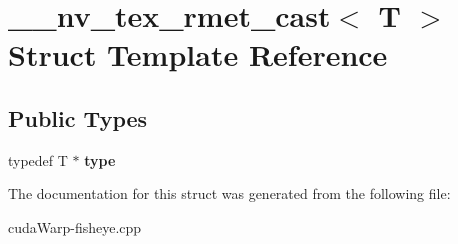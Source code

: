 \hypertarget{struct____nv__tex__rmet__cast}{}\section{\+\_\+\+\_\+nv\+\_\+tex\+\_\+rmet\+\_\+cast$<$ T $>$ Struct Template Reference}
\label{struct____nv__tex__rmet__cast}
\subsection*{Public Types}
\begin{DoxyCompactItemize}
\item 
typedef T $\ast$ {\bfseries type}\hypertarget{struct____nv__tex__rmet__cast_a8805d037f62b817c730f817b9da2549f}{}\label{struct____nv__tex__rmet__cast_a8805d037f62b817c730f817b9da2549f}

\end{DoxyCompactItemize}


The documentation for this struct was generated from the following file\+:\begin{DoxyCompactItemize}
\item 
cuda\+Warp-\/fisheye.\+cpp\end{DoxyCompactItemize}
